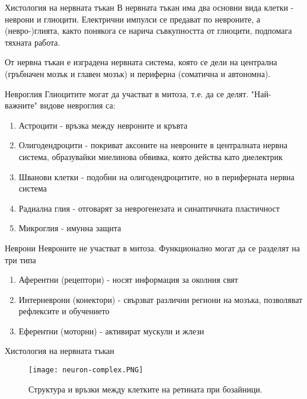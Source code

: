 \begin{frame}[t]{Хистология на нервната тъкан}
    В нервната тъкан има два основни вида клетки - неврони и глиоцити.
    Електрични импулси се предават по невроните, а (невро-)глията, 
    както понякога се нарича съвкупността от глиоцити, подпомага тяхната работа.

    От нервна тъкан е изградена нервната система, която се дели на централна (гръбначен мозък и главен мозък) и периферна (соматична и автономна).
\end{frame}

\begin{frame}[t]{Невроглия}
    Глиоцитите могат да участват в митоза, т.е. да се делят. "Най-важните" видове невроглия са:
    \begin{enumerate}
        \item Астроцити - връзка между невроните и кръвта
        \item Олигодендроцити - покриват аксоните на невроните в централната нервна система, образувайки миелинова обвивка, която действа като диелектрик
        \item Шванови клетки - подобни на олигодендроцитите, но в периферната нервна система
        \item Радиална глия - отговарят за неврогенезата и синаптичната пластичност
        \item Микроглия - имунна защита
    \end{enumerate}
\end{frame}

\begin{frame}[t]{Неврони}
    Невроните не участват в митоза. Функционално могат да се разделят на три типа
    \begin{enumerate}
        \item Аферентни (рецептори) - носят информация за околния свят 
        \item Интерневрони (конектори) - свързват различни региони на мозъка, позволяват рефлексите и обучението 
        \item Еферентни (моторни) - активират мускули и жлези
    \end{enumerate}
\end{frame}

\begin{frame}[t]{Хистология на нервната тъкан}
    \begin{figure}[htbp!]
      \centering
      \texttt{[image: neuron-complex.PNG]}
      \caption{Структура и връзки между клетките на ретината при бозайници. \cite[Фиг 1.2]{Neuron}}
    \end{figure}
\end{frame}

